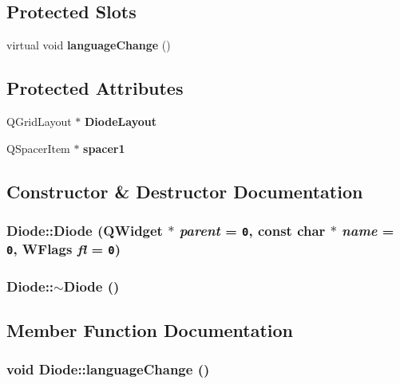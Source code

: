 \subsection*{Protected Slots}
\begin{CompactItemize}
\item 
virtual void {\bf language\-Change} ()
\end{CompactItemize}
\subsection*{Protected Attributes}
\begin{CompactItemize}
\item 
QGrid\-Layout $\ast$ {\bf Diode\-Layout}
\item 
QSpacer\-Item $\ast$ {\bf spacer1}
\end{CompactItemize}


\subsection{Constructor \& Destructor Documentation}
\subsubsection{\setlength{\rightskip}{0pt plus 5cm}Diode::Diode (QWidget $\ast$ {\em parent} = {\tt 0}, const char $\ast$ {\em name} = {\tt 0}, WFlags {\em fl} = {\tt 0})}\label{classDiode_739b8700a310e8bb694e534e655b32d4}


\subsubsection{\setlength{\rightskip}{0pt plus 5cm}Diode::$\sim$Diode ()}\label{classDiode_dae5a0862e5ef599115e10193eb9bd32}




\subsection{Member Function Documentation}
\subsubsection{\setlength{\rightskip}{0pt plus 5cm}void Diode::language\-Change ()\hspace{0.3cm}{\tt  [protected, virtual, slot]}}\label{classDiode_1182bf5637039731d24c9b1e622b4179}




